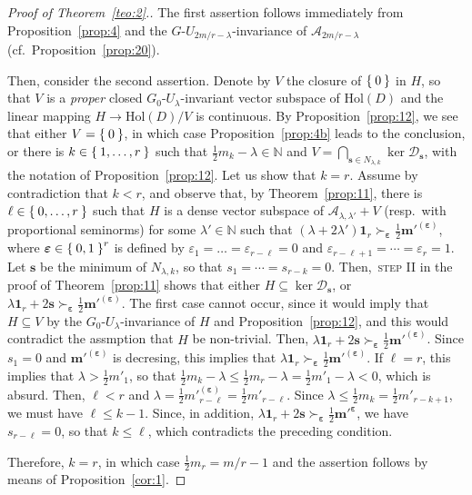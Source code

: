 \documentclass[10.5pt,reqno]{amsart}
\newcommand{\Hol}{\mathrm{Hol}}
\newcommand{\vect}[1]{\mathbf{{#1}}}
\newcommand{\N}{\mathds{N}}
\newcommand{\epsb}{\mathbold{\eps}}
\newcommand{\Ac}{\mathcal{A}}
\newcommand{\Dc}{\mathcal{D}}
\newcommand{\meg}{\leqslant}
\newcommand{\eps}{\varepsilon}
\begin{document}
\begin{proof}[Proof of Theorem~\ref{teo:2}.]
	The first assertion follows immediately from Proposition~\ref{prop:4} and the $G$-$U_{2 m/r-\lambda}$-invariance of $\Ac_{2m /r-\lambda}$ (cf.~Proposition~\ref{prop:20}).

	Then, consider the second assertion.
	Denote by $V$ the closure of $\Set{0}$ in $H$, so that $V$ is a \emph{proper} closed $G_0$-$U_\lambda$-invariant vector subspace of  $\Hol(D)$ and the linear mapping $H\to \Hol(D)/V$ is continuous. By Proposition~\ref{prop:12}, we see that either $V=\Set{0}$, in which case Proposition~\ref{prop:4b} leads to the conclusion, or there is $k\in \Set{1,\dots,r}$ such that $\frac1 2 m_{k}-\lambda\in \N$ and $V=\bigcap_{\vect s\in N_{\lambda,k}}\ker \Dc_{\vect s}$, with the notation of Proposition~\ref{prop:12}. 
	Let us show that $k=r$. Assume by contradiction that $k<r$, and observe that, by Theorem~\ref{prop:11}, there is $\ell\in \Set{0,\dots,r}$ such that $H$ is a dense vector subspace of $\Ac_{\lambda,\lambda'}+V$ (resp.\ with proportional seminorms) for some $\lambda'\in \N$ such that $(\lambda+2 \lambda')\vect 1_r\succ_\epsb \frac 1 2 \vect m'^{(\epsb)}$, where $\epsb\in \Set{0,1}^r$ is defined by $\eps_1=\dots=\eps_{r-\ell}=0$ and $\eps_{r-\ell+1}=\cdots=\eps_{r}=1$. 
	Let $\vect s$ be the minimum of $N_{\lambda,k}$, so that  $s_1=\cdots=s_{r-k}=0$. 
	Then,~\textsc{step II} in the proof of Theorem~\ref{prop:11} shows that either  $H\subseteq \ker \Dc_{\vect s}$, or $\lambda\vect 1_r + 2 \vect s\succ_\epsb \frac 1 2 \vect m'^{(\epsb)}$. 
	The first case cannot occur, since it would imply that $H\subseteq V$ by the $G_0$-$U_\lambda$-invariance of $H$ and Proposition~\ref{prop:12}, and this would contradict the assmption that $H$ be non-trivial.
	Then, $\lambda\vect 1_r + 2 \vect s\succ_\epsb \frac 1 2 \vect m'^{(\epsb)}$. Since $s_1=0$ and $\vect m'^{(\epsb)}$ is decresing, this implies that $\lambda \vect 1_r\succ_{\epsb} \frac 1 2 \vect m'^{(\epsb)}$. If $\ell=r$, this implies that $\lambda > \frac 1 2 m'_1$, so that $\frac{1}{2} m_k-\lambda\meg \frac 1 2 m_r -\lambda=\frac 1 2 m'_1-\lambda<0$, which is absurd.
	Then, $\ell<r$ and   $\lambda=\frac1 2 m'^{(\epsb)}_{r-\ell}=\frac 1 2 m'_{r-\ell}$.
	Since $\lambda \meg \frac 1 2 m_k= \frac 1 2 m'_{r-k+1}$, we must have $\ell\meg k-1$. Since, in addition, $\lambda \vect 1_r+2\vect s\succ_{\epsb} \frac 1 2 \vect m'^{\epsb}$, we have $s_{r-\ell}=0$, so that  $k\meg \ell $,  which contradicts the preceding condition. 
	
	Therefore, $k=r$, in which case $\frac 1 2 m_{r}=m /r-1$ and the assertion follows by means of Proposition~\ref{cor:1}.
\end{proof}
\end{document}
